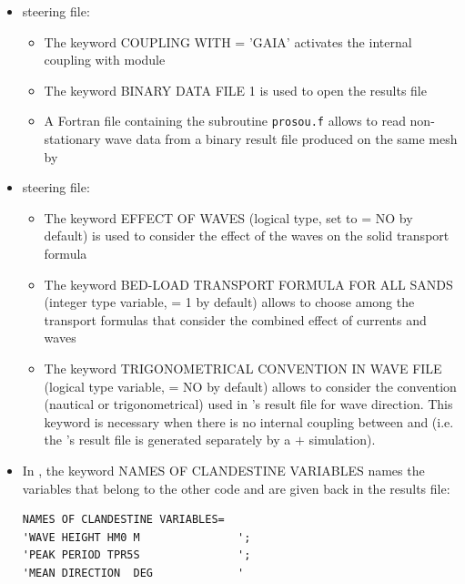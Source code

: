 \begin{itemize}
\item {} steering file:
\begin{itemize}
\item The keyword {\ttfamily COUPLING WITH = 'GAIA'} activates the internal coupling with module \gaia{}
\item The keyword {\ttfamily BINARY DATA FILE 1} is used to open the \tomawac{} results file
\item A Fortran file containing the subroutine \texttt{prosou.f} allows to read non-stationary wave data from a binary result file produced on the same mesh by \tomawac{}
\end{itemize}
\item \gaia{} steering file:
\begin{itemize}
\item The keyword {\ttfamily EFFECT OF WAVES} (logical type, set to {\ttfamily = NO} by default) is used to consider the effect of the waves on the solid transport formula
\item The keyword {\ttfamily BED-LOAD TRANSPORT FORMULA FOR ALL SANDS} (integer type variable, {\ttfamily = 1} by default) allows to choose among the transport formulas that consider the combined effect of currents and waves
\item The keyword {\ttfamily TRIGONOMETRICAL CONVENTION IN WAVE FILE} (logical type variable, {\ttfamily = NO} by default) allows to consider the convention (nautical or trigonometrical) used in \tomawac{}'s result file for wave direction. This keyword is necessary when there is no internal coupling between \gaia{} and \tomawac{} (i.e. the \tomawac{}'s result file is generated separately by a  $+$ \tomawac{} simulation).
\end{itemize}
\end{itemize}

\begin{itemize}
\item In , the keyword {\ttfamily NAMES OF CLANDESTINE VARIABLES} names the variables that belong to the other code and are given back in the results file:
\begin{lstlisting}[frame=trBL]
NAMES OF CLANDESTINE VARIABLES=
'WAVE HEIGHT HM0 M               ';
'PEAK PERIOD TPR5S               ';
'MEAN DIRECTION  DEG             '
\end{lstlisting}
\end{itemize}

